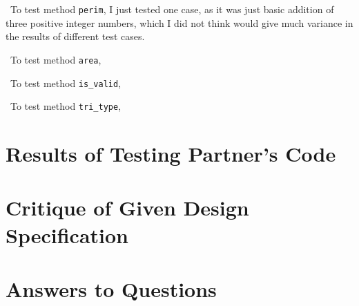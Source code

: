 \documentclass[12pt]{article}
\begin{document}
~\newline\noindent To test method \verb|perim|, I just tested one case, as it 
was just basic addition of three positive integer numbers, which I did not think 
would give much variance in the results of different test cases. 

~\newline\noindent To test method \verb|area|,

~\newline\noindent To test method \verb|is_valid|,

~\newline\noindent To test method \verb|tri_type|,



\section{Results of Testing Partner's Code}


\section{Critique of Given Design Specification}


\section{Answers to Questions}
\end{document}
